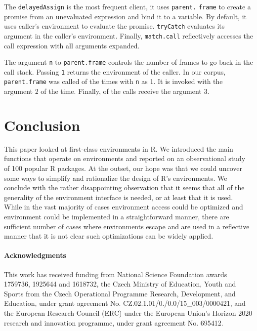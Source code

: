 \documentclass[10pt,sigplan,authorversion=true]{acmart}
\renewcommand{\c}[1]{\lstinline |#1|\xspace}
\begin{document}
\noindent
The \c{delayedAssign} is the most frequent client, it uses \c{parent.} \c{frame}
to create a promise from an unevaluated expression and bind it to a variable. By
default, it uses caller's environment to evaluate the promise. \c{tryCatch}
evaluates its argument in the caller's environment. Finally, \c{match.call}
reflectively accesses the call expression with all arguments expanded.


The argument \c{n} to \c{parent.frame} controls the number of frames to go back
in the call stack. Passing \c{1} returns the environment of the caller. In our
corpus, \c{parent.frame} was called \ParentFrameDepthOneCallPerc of the times
with \c{n} as 1. It is invoked with the argument 2 \ParentFrameDepthTwoCallPerc
of the time. Finally, \ParentFrameDepthThreeCallPerc of the calls receive the
argument {3}.


\section{Conclusion}

This paper looked at first-class environments in R. We introduced the main
functions that operate on environments and reported on an observational study of
100 popular R packages. At the outset, our hope was that we could uncover some
ways to simplify and rationalize the design of R's environments. We conclude
with the rather disappointing observation that it seems that all of the
generality of the environment interface is needed, or at least that it is used.
While in the vast majority of cases environment access could be optimized and
environment could be implemented in a straightforward manner, there are
sufficient number of cases where environments escape and are used in a
reflective manner that it is not clear such optimizations can be widely applied.


\paragraph{Acknowledgments}
This work has received funding from National Science Foundation awards 1759736,
1925644 and 1618732, the Czech Ministry of Education, Youth and Sports from the
Czech Operational Programme Research, Development, and Education, under grant
agreement No. CZ.02.1.01/0./0.0/15\_003/0000421, and the European Research
Council (ERC) under the European Union’s Horizon 2020 research and innovation
programme, under grant agreement No. 695412.


\end{document}
